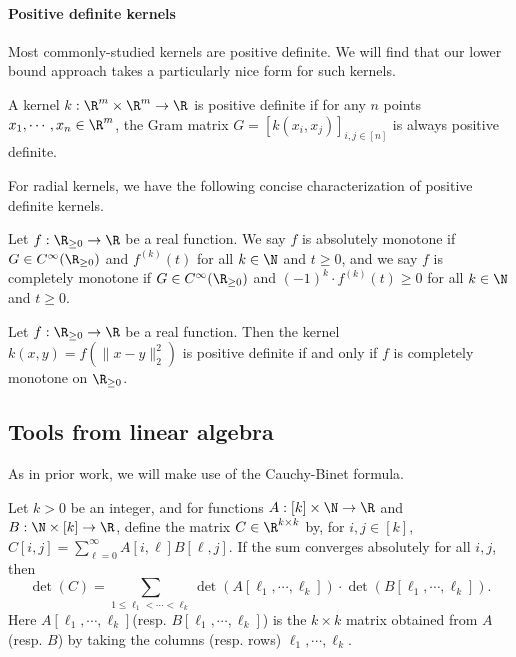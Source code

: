 \paragraph{Positive definite kernels}
Most commonly-studied kernels are positive definite. We will find that our lower bound approach takes a particularly nice form for such kernels.

\begin{definition}
A kernel $k: \R^m \times \R^m \rightarrow \R$ is positive definite if for any $n$ points $x_1, \cdots, x_n \in \R^m$, the Gram matrix $G = [k(x_i, x_j)]_{i, j \in [n]}$ is always positive definite.
\end{definition}
For radial kernels, we have the following concise characterization of positive definite kernels.
\begin{definition}
Let $f:\R_{\ge 0} \rightarrow \R$ be a real function. We say $f$ is absolutely monotone if $G \in C^{\infty}(\R_{\ge 0})$ and $f^{(k)}(t)$ for all $k \in \N$ and $t \ge 0$, and we say $f$ is completely monotone if $G \in C^{\infty}(\R_{\ge 0})$ and $(-1)^{k} \cdot f^{(k)}(t) \ge 0$ for all $k \in \N$ and $t \ge 0$.
\end{definition}
\begin{theorem} \label{schoenberg} Let $f:\R_{\ge 0} \rightarrow \R$ be a real function. Then the kernel $k(x, y) = f(\|x-y\|_2^2)$ is positive definite if and only if $f$ is completely monotone on $\R_{\ge 0}$.
\end{theorem}

\subsection{Tools from linear algebra}
\label{subsec:CauchyBinetTool}

As in prior work, we will make use of the Cauchy-Binet formula.

\begin{lemma}
Let $k>0$ be an integer, and for functions $A: [k] \times \N \rightarrow \R$ and $B: \N \times [k] \rightarrow \R$, define the matrix $C \in \R^{k \times k}$ by, for $i, j \in [k]$, $C[i, j] = \sum_{\ell=0}^{\infty} A[i, \ell]B[\ell, j]$.
If the sum converges absolutely for all $i, j$, then
\[\det(C) = \sum_{1 \le \ell_1 < \cdots < \ell_k}
\det(A[\ell_1, \cdots, \ell_k]) \cdot \det(B[\ell_1, \cdots, \ell_k]).\]
Here $A[\ell_1, \cdots, \ell_k]$(resp. $B[\ell_1, \cdots, \ell_k]$) is the $k \times k$ matrix obtained from $A$ (resp. $B$) by taking the columns (resp. rows) $\ell_1, \cdots, \ell_k$.
\end{lemma}

